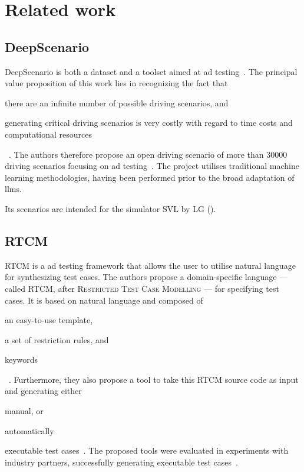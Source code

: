 \chapter{Related work}\label{sec:relatedWork}

\section{DeepScenario}\label{sec:deepScenario}

DeepScenario is both a dataset and a toolset aimed at \acrlong{ad} testing~\cite{DeepScenario}. The
principal value proposition of this work lies in recognizing the fact that \begin{inparaenum}
    \item there are an infinite number of possible driving scenarios, and
    \item generating critical driving scenarios is very costly with regard to time costs and
    computational resources\end{inparaenum}~\cite[52]{DeepScenario}. The authors therefore propose
an open driving scenario of more than \num{30000} driving scenarios focusing on \acrshort{ad}
testing~\cite[52]{DeepScenario}. The project utilises traditional machine learning
methodologies, having been performed prior to the broad adaptation of \acrshort{llms}.

Its scenarios are intended for the simulator SVL by LG ().

\section{RTCM}

RTCM is a \acrshort{ad} testing framework that allows the user to utilise natural language for
synthesizing test cases. The authors propose a domain-specific language --- called RTCM, after
\textsc{Restricted Test Case Modelling} --- for specifying test cases. It is based on natural language
and composed of \begin{inparaenum}
    \item an easy-to-use template,
    \item a set of restriction rules, and
    \item keywords \end{inparaenum}~\cite[397]{RTCM}.  Furthermore, they also propose a tool to
take this RTCM source code as input and generating either \begin{inparaenum}
    \item manual, or
    \item automatically \end{inparaenum} executable test cases~\cite[397]{RTCM}. The proposed tools
were evaluated in experiments with industry partners, successfully generating executable test
cases~\cite[397]{RTCM}.

